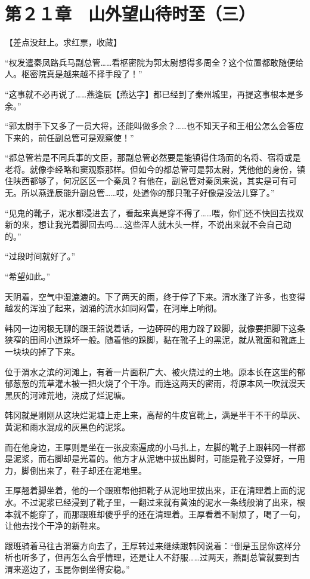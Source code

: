 \section{第２１章　山外望山待时至（三）}

【差点没赶上。求红票，收藏】

“权发遣秦凤路兵马副总管……看枢密院为郭太尉想得多周全？这个位置都敢随便给人。枢密院真是越来越不择手段了！”

“这事就不必再说了……燕逢辰【燕达字】都已经到了秦州城里，再提这事根本是多余。”

“郭太尉手下又多了一员大将，还能叫做多余？……也不知天子和王相公怎么会答应下来的，前任副总管可是观察使！”

“都总管若是不同兵事的文臣，那副总管必然要是能镇得住场面的名将、宿将或是老将。就像李经略和窦观察那样。但如今的都总管可是郭太尉，凭他他的身份，镇住陕西都够了，何况区区一个秦凤？有他在，副总管对秦凤来说，其实是可有可无。所以燕逢辰能升副总管……哎，处道你的那只靴子好像是没法儿穿了。”

“见鬼的靴子，泥水都浸进去了，看起来真是穿不得了……喂，你们还不快回去找双新的来，想让我光着脚回去吗……这些浑人就木头一样，不说出来就不会自己动的。”

“过段时间就好了。”

“希望如此。”

天阴着，空气中湿漉漉的。下了两天的雨，终于停了下来。渭水涨了许多，也变得越发的浑浊了起来，汹涌的流水如同闷雷，在河岸上响彻。

韩冈一边闲极无聊的跟王韶说着话，一边砰砰的用力跺了跺脚，就像要把脚下这条狭窄的田间小道跺坏一般。随着他的跺脚，黏在靴子上的黑泥，就从靴面和靴底上一块块的掉了下来。

位于渭水之滨的河滩上，有着一片面积广大、被火烧过的土地。原本长在这里的郁郁葱葱的荒草灌木被一把火烧了个干净。而连这两天的密雨，将原本风一吹就漫天黑灰的河滩荒地，浇成了烂泥塘。

韩冈就是刚刚从这块烂泥塘上走上来，高帮的牛皮官靴上，满是半干不干的草灰、黄泥和雨水混成的灰黑色的泥浆。

而在他身边，王厚则是坐在一张皮索遍成的小马扎上，左脚的靴子上跟韩冈一样都是泥浆，而右脚却是光着的。他方才从泥塘中拔出脚时，可能是靴子没穿好，一用力，脚倒出来了，鞋子却还在泥地里。

王厚翘着脚坐着，他的一个跟班帮他把靴子从泥地里拔出来，正在清理着上面的泥水。不过泥浆已经浸到了靴子里，一翻过来就有黄浊的泥水一条线般淌了出来，根本就不能穿了，而那跟班却傻乎乎的还在清理着。王厚看着不耐烦了，喝了一句，让他去找个干净的新鞋来。

跟班骑着马往古渭寨方向去了，王厚转过来继续跟韩冈说着：“倒是玉昆你这样分析也听多了，但再怎么合乎情理，还是让人不舒服……过两天，燕副总管就要到古渭来巡边了，玉昆你倒坐得安稳。”

